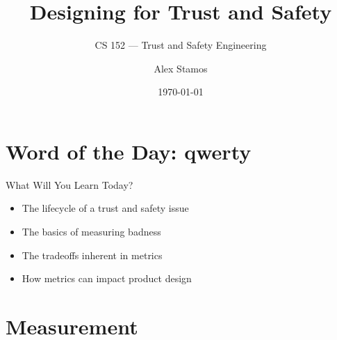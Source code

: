 \documentclass[nobackground,dvipsnames,table]{beamer}
\title{Designing for Trust and Safety}
\subtitle{CS 152 --- Trust and Safety Engineering}
\author[A. Stamos]{Alex Stamos}
\institute[Stanford University]{Stanford Cyber Policy Center}
\date[2022]{\today}
\begin{document}
\begin{frame}
    \titlepage
\end{frame}

\section{Word of the Day: qwerty}

\begin{frame}{What Will You Learn Today?}
    \begin{itemize}
        \item The lifecycle of a trust and safety issue
        \item The basics of measuring badness
        \item The tradeoffs inherent in metrics
        \item How metrics can impact product design
    \end{itemize}
\end{frame}

\section{Measurement}
\end{document}
